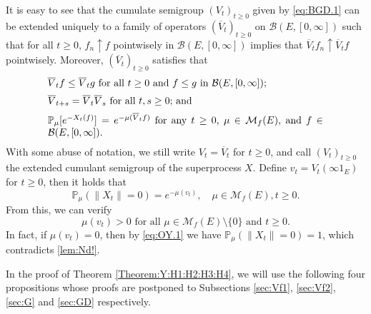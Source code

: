 \documentclass[12pt,a4paper]{amsart}
\numberwithin{equation}{section}
\theoremstyle{plain}
\theoremstyle{definition}
\theoremstyle{remark}
\begin{document}
	It is easy to see that the cumulate  semigroup $(V_t)_{t\geq 0}$ given by \eqref{eq:BGD.1} can be extended uniquely to a family of operators $(\overline V_t)_{t\geq 0}$
	on $\mathcal B(E,[0,\infty])$ such that for all $t\geq 0$, $f_n \uparrow f$ pointwisely in  $\mathcal B(E, [0,\infty])$ implies that $\overline V_tf_n \uparrow \overline V_tf$ pointwisely.
	Moreover, $(\overline V_t)_{t\geq 0}$ satisfies that
\begin{equation}
\begin{minipage}{0.8\textwidth}
	$\overline V_t f \leq \overline V_t g$ for all $t\geq 0$ and $f\leq g$ in $\mathcal B(E,[0,\infty])$;
\end{minipage}\label{Fact:BV!}
\end{equation}
\begin{equation}
\begin{minipage}{0.8\textwidth}
	$\overline V_{t+s} = \overline V_t \overline V_s$ for all $t, s\geq 0$;  and
\end{minipage} \label{eq:OY.0}
\end{equation}
\begin{equation}
\begin{minipage}{0.8\textwidth}
	$\mathbb P_\mu [e^{-X_t(f)}] = e^{- \mu(\overline V_tf)}$ for any $t\geq 0$, $\mu \in \mathcal M_f(E)$, and $f\in \mathcal B(E,[0,\infty])$.
\end{minipage} \label{eq:BGD.2}
\end{equation}
	With some abuse of notation, we still write $V_t = \overline V_t$ for $t\geq 0$, and call $(V_t)_{t\geq 0}$ the extended cumulant semigroup of the superprocess $X$.
	Define $v_t = V_t(\infty 1_E)$ for $t\geq 0$, then it holds that
\begin{equation} \label{eq:OY.1}
	\mathbb P_\mu (\|X_t\| = 0)
	= e^{- \mu (v_t)},
	\quad \mu \in \mathcal M_f(E), t\geq 0.
\end{equation}
	From this, we can verify
\begin{equation}\label{lem:sv2!}
	\text{$\mu(v_t) > 0$ for all $\mu \in \mathcal M_f(E)\setminus\{0\}$ and $t \geq 0$.}
\end{equation}
	In fact, if $\mu(v_t) = 0$, then by \eqref{eq:OY.1} we have $\mathbb P_\mu(\|X_t \| = 0) = 1$, which contradicts \eqref{lem:Nd!}.

	In the  proof of Theorem \ref{Theorem:Y:H1:H2:H3:H4}, we will use the following four propositions whose proofs are postponed to Subsections \ref{sec:Vf1}, \ref{sec:Vf2}, \ref{sec:G} and \ref{sec:GD} respectively.
\end{document}

